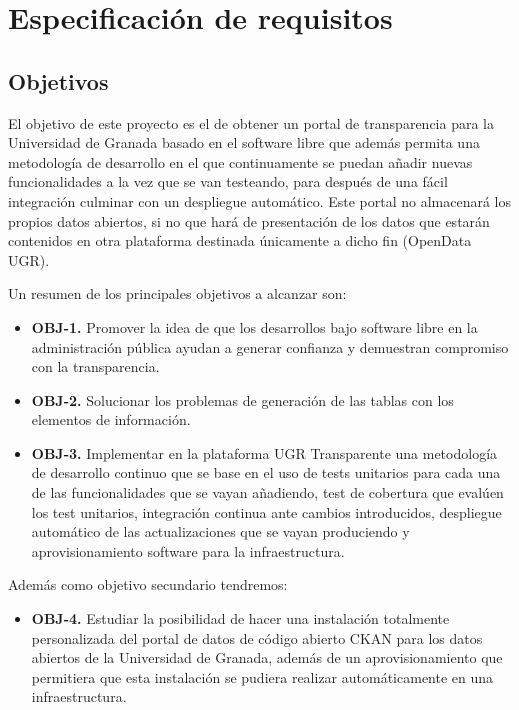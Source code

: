 \chapter{Especificación de requisitos}

\section{Objetivos}

El objetivo de este proyecto es el de obtener un portal de transparencia para la Universidad de Granada basado en el software 
libre que además permita una metodología de desarrollo en el que continuamente se puedan añadir nuevas funcionalidades a la 
vez que se van testeando, para después de una fácil integración culminar con un despliegue automático. Este portal no almacenará
los propios datos abiertos, si no que hará de presentación de los datos que estarán contenidos en otra plataforma destinada 
únicamente a dicho fin (OpenData UGR).

\bigskip
Un resumen de los principales objetivos a alcanzar son:

\begin{itemize}
  \item \textbf{OBJ-1.} Promover la idea de que los desarrollos bajo software libre en la administración pública ayudan a 
  generar confianza y demuestran compromiso con la transparencia.
  \item \textbf{OBJ-2.} Solucionar los problemas de generación de las tablas con los elementos de información.
  \item \textbf{OBJ-3.} Implementar en la plataforma UGR Transparente una metodología de desarrollo continuo que se base 
  en el uso de tests unitarios para cada una de las funcionalidades que se vayan añadiendo, test de 
  cobertura que evalúen los test unitarios, integración continua ante cambios introducidos, despliegue automático de las
  actualizaciones que se vayan produciendo y aprovisionamiento software para la infraestructura.
\end{itemize}

\newpage
Además como objetivo secundario tendremos:

\begin{itemize}
  \item \textbf{OBJ-4.} Estudiar la posibilidad de hacer una instalación totalmente personalizada del portal de datos de código
  abierto CKAN para los datos abiertos de la Universidad de Granada, además de un aprovisionamiento que permitiera que esta 
  instalación se pudiera realizar automáticamente en una infraestructura.
\end{itemize}

